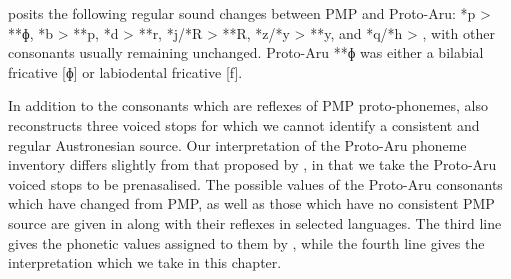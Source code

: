 \citet{Nivens1993,Nivens2017} posits the following regular sound changes
between PMP and Proto-Aru: *p > **ɸ,
*b > **p, *d > **r,
*j/*R > **R, *z/*y > **y,
and *q/*h > {\0}, with other consonants usually remaining unchanged.
Proto-Aru **ɸ was either a bilabial fricative [ɸ] or labiodental fricative [f].

In addition to the consonants which are reflexes of PMP proto-phonemes,
\citet{Nivens2017} also reconstructs three voiced stops for which
we cannot identify a consistent
and regular Austronesian source.
Our interpretation of the Proto-Aru phoneme inventory differs
slightly from that proposed by \citet{Nivens1993,Nivens2017}, in that we take the Proto-Aru voiced stops to be prenasalised.
The possible values of the Proto-Aru consonants which have changed
from PMP, as well as those which have no consistent PMP source are given
in  along with their reflexes in selected languages.
The third line gives the phonetic values assigned to them by
\citet{Nivens1993,Nivens2017}, while the fourth line gives the interpretation which we
take in this chapter.


